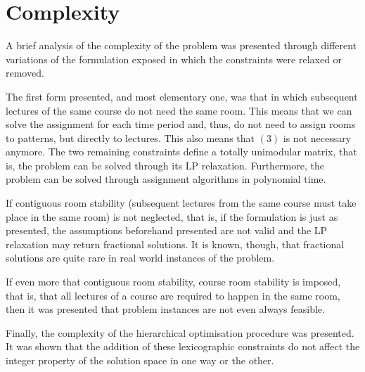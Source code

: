 \section{Complexity}

A brief analysis of the complexity of the problem was presented through different variations of the formulation exposed in which the constraints were relaxed or removed.

The first form presented, and most elementary one, was that in which subsequent lectures of the same course do not need the same room. This means that we can solve the assignment for each time period and, thus, do not need to assign rooms to patterns, but directly to lectures. This also means that $(3)$ is not necessary anymore. The two remaining constraints define a totally unimodular matrix, that is, the problem can be solved through its LP relaxation. Furthermore, the problem can be solved through assignment algorithms in polynomial time.

If contiguous room stability (subsequent lectures from the same course must take place in the same room) is not neglected, that is, if the formulation is just as presented, the assumptions beforehand presented are not valid and the LP relaxation may return fractional solutions. It is known, though, that fractional solutions are quite rare in real world instances of the problem.

If even more that contiguous room stability, course room stability is imposed, that is, that all lectures of a course are required to happen in the same room, then it was presented that problem instances are not even always feasible.

Finally, the complexity of the hierarchical optimisation procedure was presented. It was shown that the addition of these lexicographic constraints do not affect the integer property of the solution space in one way or the other.


